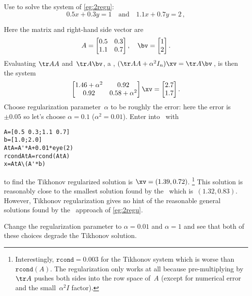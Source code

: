 \begin{example} 
Use  to solve the system of \cref{eg:2regu}:
\begin{equation*}
0.5x+0.3y=1\quad\text{and}\quad 1.1x+0.7y=2\,,
\end{equation*}
\begin{solution} 
Here the matrix and right-hand side vector are
\begin{equation*}
A=\begin{bmatrix} 0.5&0.3\\1.1&0.7 \end{bmatrix},\quad
\bv=\begin{bmatrix} 1\\2 \end{bmatrix}.
\end{equation*}
Evaluating \(\tr AA\) and~\(\tr A\bv\), a , \((\tr AA+\alpha^2I_n)\xv=\tr A\bv\)\,, is then the system
\begin{equation*}
\begin{bmatrix} 1.46+\alpha^2&0.92\\0.92&0.58+\alpha^2 \end{bmatrix}\xv=\begin{bmatrix} 2.7\\1.7 \end{bmatrix}.
\end{equation*}
Choose regularization parameter~\(\alpha\) to be roughly the error: here the error is~\(\pm0.05\) so let's choose \(\alpha=0.1\) (\(\alpha^2=0.01\)).
Enter into \script\ with
\begin{verbatim}
A=[0.5 0.3;1.1 0.7]
b=[1.0;2.0]
AtA=A'*A+0.01*eye(2)
rcondAtA=rcond(AtA)
x=AtA\(A'*b)
\end{verbatim}
\setbox\ajrqrbox\hbox{}%
\marginajrbox%
to find the Tikhonov regularized solution is \(\xv=(1.39,0.72)\).%
\footnote{Interestingly, \(\texttt{rcond}=0.003\) for the Tikhonov system which is worse than \(\texttt{rcond}(A)\).  The regularization only works at all because pre-multiplying by~\(\tr A\) pushes both sides into the row space of~\(A\) (except for numerical error and the small~\(\alpha^2I\) factor).}
This solution is reasonably close to the smallest solution found by the \svd\ which is~\((1.32,0.83)\).
However, Tikhonov regularization gives no hint of the reasonable general solutions found by the \svd\ approach of \cref{eg:2regu}.

Change the regularization parameter to \(\alpha=0.01\) and \(\alpha=1\) and see that both of these choices degrade the Tikhonov solution.
\end{solution}
\end{example}




